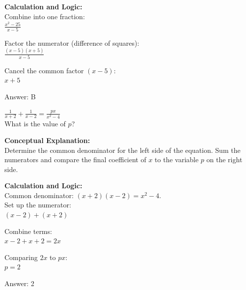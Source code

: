 \documentclass[11pt,paper=a4,answers]{exam}
\begin{document}
\begin{questions}
\begin{solution}
\vspace{20pt}

\textbf{Calculation and Logic:} \\
Combine into one fraction: \\
$\frac{x^2 - 25}{x-5}$

\vspace{10pt}

Factor the numerator (difference of squares): \\
$\frac{(x-5)(x+5)}{x-5}$

\vspace{10pt}

Cancel the common factor $(x-5)$: \\
$x+5$

\vspace{25pt}

Answer: \colorbox{yellow!100}{B}
\end{solution}

\vspace{40pt}

\question
$\frac{1}{x+2} + \frac{1}{x-2} = \frac{px}{x^2 - 4}$ \\
What is the value of $p$?

\begin{solution}
\textbf{Conceptual Explanation:} \\
Determine the common denominator for the left side of the equation. Sum the numerators and compare the final coefficient of $x$ to the variable $p$ on the right side.

\vspace{20pt}

\textbf{Calculation and Logic:} \\
Common denominator: $(x+2)(x-2) = x^2 - 4$. \\
Set up the numerator: \\
$(x-2) + (x+2)$

\vspace{10pt}

Combine terms: \\
$x - 2 + x + 2 = 2x$

\vspace{10pt}

Comparing $2x$ to $px$: \\
$p = 2$

\vspace{25pt}

Answer: \colorbox{yellow!100}{2}
\end{solution}


\end{questions}
\end{document}
